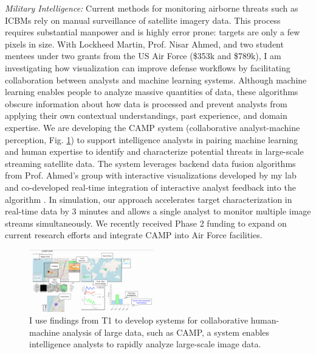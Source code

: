 \documentclass[11pt]{article}
\begin{document}
\emph{Military Intelligence:} Current methods for monitoring airborne threats such as ICBMs rely on manual surveillance of satellite imagery data. This process requires substantial manpower and is highly error prone: targets are only a few pixels in size. With Lockheed Martin, Prof. Nisar Ahmed, and two student mentees under two grants from the US Air Force (\$353k and \$789k), I am investigating how visualization can improve defense workflows
by facilitating collaboration between analysts and machine learning systems. Although machine learning enables people to analyze massive quantities of data, these algorithms obscure information about how data is processed and prevent analysts from applying their own contextual understandings, past experience, and domain expertise. 
We are developing the CAMP system (collaborative analyst-machine perception, Fig. \ref{interface}) to support intelligence analysts in pairing machine learning and human expertise to identify and characterize potential threats in large-scale streaming satellite data.
The system leverages backend data fusion algorithms from Prof. Ahmed's group with interactive visualizations developed by my lab and co-developed real-time integration of interactive analyst feedback into the algorithm \cite{muesing2019}. In simulation, our approach accelerates target characterization in real-time data by 3 minutes and allows a single analyst to monitor multiple image streams simultaneously. We recently received Phase 2 funding to expand on current research efforts and integrate CAMP into Air Force facilities. 

\begin{figure}
	\begin{center}
		\includegraphics[width=0.48\textwidth]{interface}
	\end{center}
	\caption{I use findings from T1 to develop systems for collaborative human-machine analysis of large data, such as CAMP, a system enables intelligence analysts to rapidly analyze large-scale image data.}\label{interface}
\end{figure}
\end{document}
